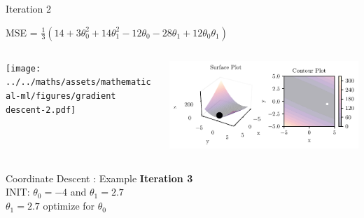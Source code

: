 \documentclass{beamer}
\begin{document}
\begin{frame}{Iteration 2}

MSE = $\frac{1}{3}(14+3\theta_{0}^{2}+14\theta_{1}^{2}-12\theta_{0}-28\theta_{1}+12\theta_{0}\theta_{1})$\\

\begin{columns}
\begin{column}{0.6\textwidth}
\begin{adjustbox}{max totalsize={\textwidth},center}
\texttt{[image: ../../maths/assets/mathematical-ml/figures/gradient descent-2.pdf]}
\end{adjustbox}

\end{column}
\begin{column}{0.5\textwidth}
\begin{adjustbox}{max totalsize={\textwidth},center}
\includegraphics[width=\textwidth]{../../maths/assets/mathematical-ml/figures/contour-linreg-2.pdf}
\end{adjustbox}
\end{column}
\end{columns}


\end{frame}

\begin{frame}{Coordinate Descent : Example}
\textbf{Iteration 3}\\
\vspace{0.5cm}
INIT: $\theta_{0} = -4$ and $\theta_{1}  = 2.7$\\

\vspace{0.5cm}
$\theta_1 = 2.7$ optimize for $\theta_{0}$\\ 


\end{frame}
\end{document}
